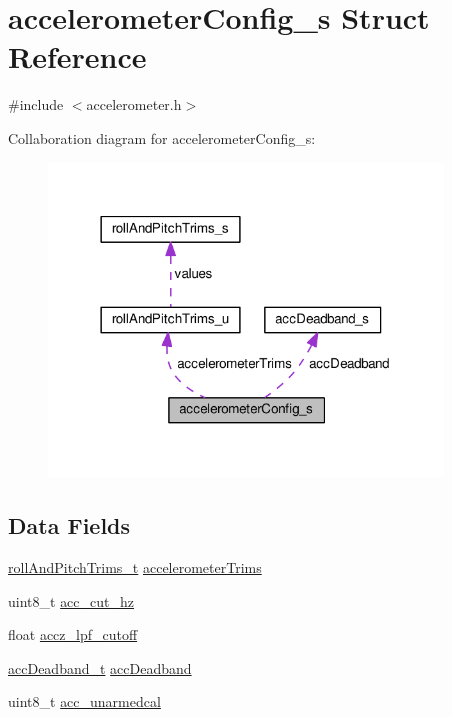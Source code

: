 \hypertarget{structaccelerometerConfig__s}{\section{accelerometer\+Config\+\_\+s Struct Reference}
\label{structaccelerometerConfig__s}
}


{\ttfamily \#include $<$accelerometer.\+h$>$}



Collaboration diagram for accelerometer\+Config\+\_\+s\+:\nopagebreak
\begin{figure}[H]
\begin{center}
\leavevmode
\includegraphics[width=297pt]{structaccelerometerConfig__s__coll__graph}
\end{center}
\end{figure}
\subsection*{Data Fields}
\begin{DoxyCompactItemize}
\item 
\hyperlink{accelerometer_8h_a14ad74936b3459637b77a43273a8ef6e}{roll\+And\+Pitch\+Trims\+\_\+t} \hyperlink{structaccelerometerConfig__s_a71faf86978f3b466f2d0083021232aaa}{accelerometer\+Trims}
\item 
uint8\+\_\+t \hyperlink{structaccelerometerConfig__s_ac13dc72099e2e62ede5318939c8d4fda}{acc\+\_\+cut\+\_\+hz}
\item 
float \hyperlink{structaccelerometerConfig__s_a468be631025624ac2c38f5122d3be62c}{accz\+\_\+lpf\+\_\+cutoff}
\item 
\hyperlink{accelerometer_8h_a99dfebf30dde68077eb35a5ffd7c088e}{acc\+Deadband\+\_\+t} \hyperlink{structaccelerometerConfig__s_ab610dd434ae34e85feaabe3127c0d856}{acc\+Deadband}
\item 
uint8\+\_\+t \hyperlink{structaccelerometerConfig__s_acec4732004f25a4168a530f635f9955a}{acc\+\_\+unarmedcal}
\end{DoxyCompactItemize}


